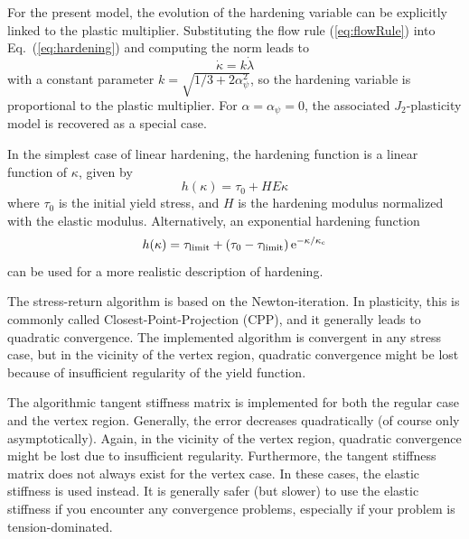 \documentclass[a4paper]{article}
\newcommand{\be}{\begin{equation}}
\newcommand{\ee}{\end{equation}}
\newcommand{\alphaPsi}{\alpha_{\psi}}
\newcommand{\kappac}{\kappa_{\mathrm{c}}}
\begin{document}
For the present model, the evolution
of the hardening variable can be explicitly linked to the plastic
multiplier.
Substituting the flow rule
(\ref{eq:flowRule}) into Eq.~(\ref{eq:hardening}) and computing the norm
leads to
\be
\label{eq:kFactor}
\dot\kappa = k \dot \lambda
\ee
with a constant parameter $k = \sqrt{1/3 + 2 \alphaPsi^2}$, so the
hardening variable is proportional to the plastic multiplier.
For $\alpha=\alphaPsi=0$, the associated $J_2$-plasticity model
is recovered as a special case.

In the simplest case of linear hardening, the hardening function is a
linear function of $\kappa$, given by
\be\label{bilin-soft}
h(\kappa)=\tau_0+H E\kappa
\ee
where $\tau_0$ is the initial yield stress, and $H$ is the
hardening modulus normalized with the elastic modulus.
Alternatively, an exponential hardening function
\be
h(\kappa) = \tau_{\mathrm{limit}} + \left( \tau_0 - \tau_{\mathrm{limit}} \right) \rm e^{-\kappa/\kappac}
\ee
can be used for a more realistic description of hardening.

The stress-return algorithm is based on the Newton-iteration.
In plasticity, this is commonly called Closest-Point-Projection (CPP),
and it generally leads to quadratic convergence.
The implemented algorithm is convergent in any stress case, but
in the vicinity of the vertex region, quadratic convergence might be
lost because of insufficient regularity of the yield function.

The algorithmic tangent stiffness matrix is implemented for both the
regular case and the vertex region.
Generally, the error decreases quadratically (of course only asymptotically).
Again, in the vicinity of the vertex region, quadratic convergence
might be lost due to insufficient regularity.
Furthermore, the tangent stiffness matrix does not always exist for
the vertex case. In these cases, the elastic stiffness is used
instead.
It is generally safer (but slower) to use the elastic stiffness if you
encounter any convergence problems, especially if your problem is
tension-dominated.
\end{document}
